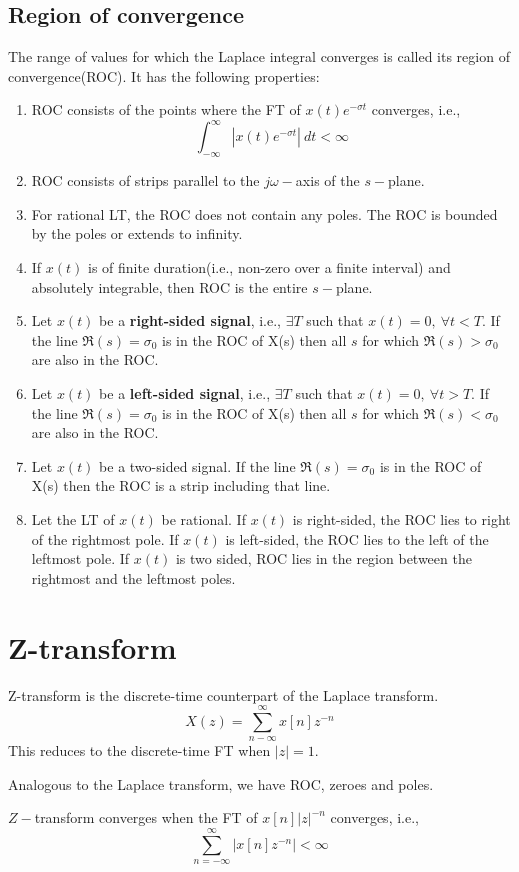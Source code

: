\documentclass[10pt, a4paper]{extarticle}
\theoremstyle{definition}
\begin{document}
\subsection{Region of convergence}
The range of values for which the Laplace integral converges is called its region of convergence(ROC). It has the following properties:
\begin{enumerate}
	\item ROC consists of the points where the FT of $x(t)e^{-\sigma t}$ converges, i.e.,
	      \[\int_{-\infty}^\infty \left|x(t)e^{-\sigma t}\right|\ dt<\infty\]
	\item ROC consists of strips parallel to the $j\omega-$axis of the $s-$plane.
	\item For rational LT, the ROC does not contain any poles. The ROC is bounded by the poles or extends to infinity.
	\item If $x(t)$ is of finite duration(i.e., non-zero over a finite interval) and absolutely integrable, then ROC is the entire $s-$plane.
	\item Let $x(t)$ be a \textbf{right-sided signal}, i.e., $\exists T$ such that $x(t)=0,\ \forall t<T$. If the line $\Re(s)=\sigma_0$ is in the ROC of X(s) then all $s$ for which $\Re(s)>\sigma_0$ are also in the ROC.
	\item Let $x(t)$ be a \textbf{left-sided signal}, i.e., $\exists T$ such that $x(t)=0,\ \forall t>T$. If the line $\Re(s)=\sigma_0$ is in the ROC of X(s) then all $s$ for which $\Re(s)<\sigma_0$ are also in the ROC.
	\item Let $x(t)$ be a two-sided signal. If the line $\Re(s)=\sigma_0$ is in the ROC of X(s) then the ROC is a strip including that line.
	\item Let the LT of $x(t)$ be rational. If $x(t)$ is right-sided, the ROC lies to right of the rightmost pole. If $x(t)$ is left-sided, the ROC lies to the left of the leftmost pole. If $x(t)$ is two sided, ROC lies in the region between the rightmost and the leftmost poles.
\end{enumerate}

\section{Z-transform}
Z-transform is the discrete-time counterpart of the Laplace transform.
\[X(z)=\sum_{n-\infty}^\infty x[n]z^{-n}\]
This reduces to the discrete-time FT when $|z|=1$.

Analogous to the Laplace transform, we have ROC, zeroes and poles.

$Z-$transform converges when the FT of $x[n]|z|^{-n}$ converges, i.e.,
\[\sum_{n=-\infty}^{\infty}\left|x[n]z^{-n}\right|<\infty\]
\end{document}
